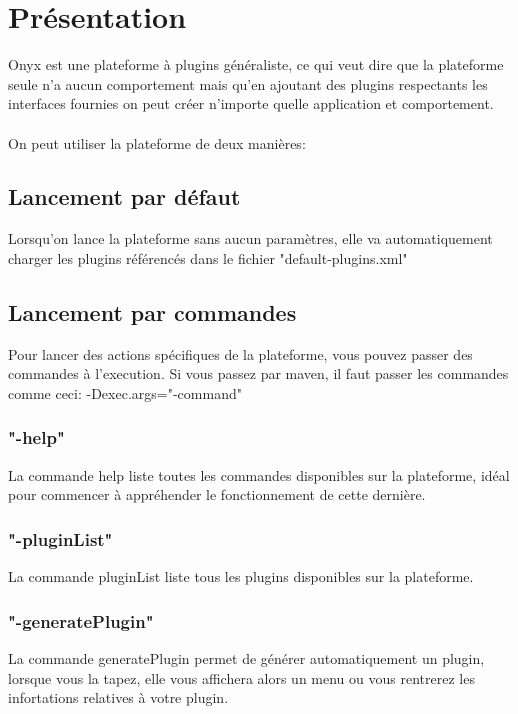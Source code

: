 \section{Présentation}

Onyx est une plateforme à plugins généraliste, ce qui veut dire que la plateforme seule n'a aucun comportement mais qu'en ajoutant des plugins respectants les interfaces fournies on peut créer n'importe quelle application et comportement.
\\
\\
On peut utiliser la plateforme de deux manières:


\subsection{Lancement par défaut}

Lorsqu'on lance la plateforme sans aucun paramètres, elle va automatiquement charger les plugins référencés dans le fichier "default-plugins.xml"

\subsection{Lancement par commandes}

Pour lancer des actions spécifiques de la plateforme, vous pouvez passer des commandes à l'execution. Si vous passez par maven, il faut passer les commandes comme ceci: -Dexec.args="-command"

\subsubsection{"-help"}
La commande help liste toutes les commandes disponibles sur la plateforme, idéal pour commencer à appréhender le fonctionnement de cette dernière.

\subsubsection{"-pluginList"}
La commande pluginList liste tous les plugins disponibles sur la plateforme.

\subsubsection{"-generatePlugin"}
La commande generatePlugin permet de générer automatiquement un plugin, lorsque vous la tapez, elle vous affichera alors un menu ou vous rentrerez les infortations relatives à votre plugin.

